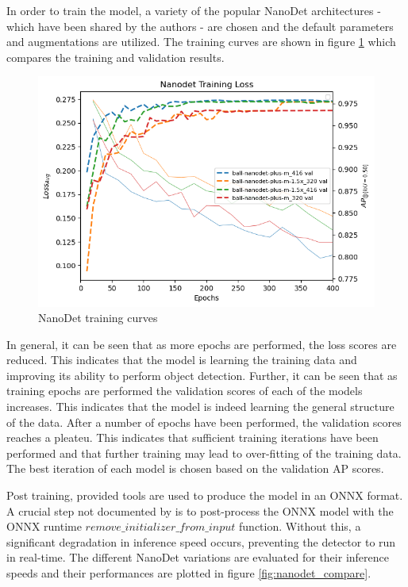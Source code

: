 \documentclass[a4paper,twoside,12pt]{report}
\begin{document}
In order to train the model, a variety of the popular NanoDet architectures - which have been shared by the authors - are chosen and the default parameters and augmentations are utilized. The training curves are shown in figure \ref{fig:nanodet_train} which compares the training and validation results.

\begin{figure}[h!]
\begin{center}
\includegraphics[width=13cm]{images/nanodet_train.png}
\caption{NanoDet training curves}
\label{fig:nanodet_train}
\end{center}
\end{figure}

In general, it can be seen that as more epochs are performed, the loss scores are reduced. This indicates that the model is learning the training data and improving its ability to perform object detection. Further, it can be seen that as training epochs are performed the validation scores of each of the models increases. This indicates that the model is indeed learning the general structure of the data. After a number of epochs have been performed, the validation scores reaches a pleateu. This indicates that sufficient training iterations have been performed and that further training may lead to over-fitting of the training data. The best iteration of each model is chosen based on the validation AP scores. 

Post training, provided tools are used to produce the model in an ONNX format. A crucial step not documented by \cite{nanodet} is to post-process the ONNX model with the ONNX runtime $remove\_initializer\_from\_input$ function. Without this, a significant degradation in inference speed occurs, preventing the detector to run in real-time. The different NanoDet variations are evaluated for their inference speeds and their performances are plotted in figure \ref{fig:nanodet_compare}.
\end{document}
